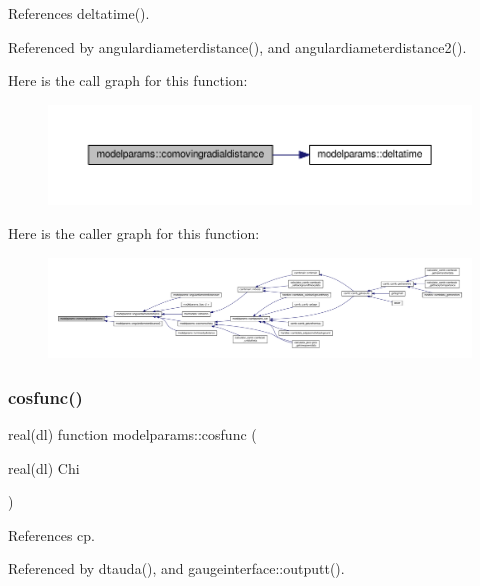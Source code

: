 References deltatime().



Referenced by angulardiameterdistance(), and angulardiameterdistance2().

Here is the call graph for this function\+:
\nopagebreak
\begin{figure}[H]
\begin{center}
\leavevmode
\includegraphics[width=350pt]{namespacemodelparams_ad0393036efc0bf4d20eba5112748a1a2_cgraph}
\end{center}
\end{figure}
Here is the caller graph for this function\+:
\nopagebreak
\begin{figure}[H]
\begin{center}
\leavevmode
\includegraphics[width=350pt]{namespacemodelparams_ad0393036efc0bf4d20eba5112748a1a2_icgraph}
\end{center}
\end{figure}
\mbox{\label{namespacemodelparams_af941ff2f9683e6bf6994f87b27ea9427}} 
\subsubsection{\texorpdfstring{cosfunc()}{cosfunc()}}
{\footnotesize\ttfamily real(dl) function modelparams\+::cosfunc (\begin{DoxyParamCaption}\item[{real(dl)}]{Chi }\end{DoxyParamCaption})}



References cp.



Referenced by dtauda(), and gaugeinterface\+::outputt().

